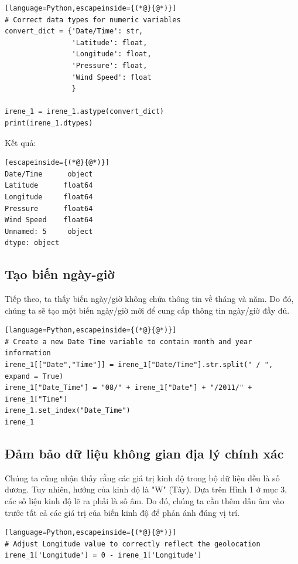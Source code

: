 \begin{lstlisting}[language=Python,escapeinside={(*@}{@*)}]
# Correct data types for numeric variables
convert_dict = {'Date/Time': str,
                'Latitude': float,
                'Longitude': float,
                'Pressure': float,
                'Wind Speed': float
                }

irene_1 = irene_1.astype(convert_dict)
print(irene_1.dtypes)
\end{lstlisting}

Kết quả:

\begin{lstlisting}[escapeinside={(*@}{@*)}]
Date/Time      object
Latitude      float64
Longitude     float64
Pressure      float64
Wind Speed    float64
Unnamed: 5     object
dtype: object
\end{lstlisting}

\subsection{Tạo biến ngày-giờ}

Tiếp theo, ta thấy biến ngày/giờ không chứa thông tin về tháng và năm. Do đó, chúng ta sẽ tạo một biến ngày/giờ mới để cung cấp thông tin ngày/giờ đầy đủ.

\begin{lstlisting}[language=Python,escapeinside={(*@}{@*)}]
# Create a new Date Time variable to contain month and year information
irene_1[["Date","Time"]] = irene_1["Date/Time"].str.split(" / ", expand = True)
irene_1["Date_Time"] = "08/" + irene_1["Date"] + "/2011/" + irene_1["Time"]
irene_1.set_index("Date_Time")
irene_1
\end{lstlisting}

\subsection{Đảm bảo dữ liệu không gian địa lý chính xác}

Chúng ta cũng nhận thấy rằng các giá trị kinh độ trong bộ dữ liệu đều là số dương. Tuy nhiên, hướng của kinh độ là "W" (Tây). Dựa trên Hình 1 ở mục 3, các số liệu kinh độ lẽ ra phải là số âm. Do đó, chúng ta cần thêm dấu âm vào trước tất cả các giá trị của biến kinh độ để phản ánh đúng vị trí.

\begin{lstlisting}[language=Python,escapeinside={(*@}{@*)}]
# Adjust Longitude value to correctly reflect the geolocation
irene_1['Longitude'] = 0 - irene_1['Longitude']
\end{lstlisting}

